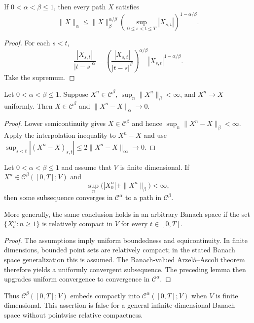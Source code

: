 \begin{lem}[Interpolation]
If $0<\alpha<\beta\le1$, then every path $X$ satisfies
\[
  \|X\|_\alpha
  \le \|X\|_\beta^{\alpha/\beta}
      \left(\sup_{0\le s<t\le T}|X_{s,t}|\right)^{1-\alpha/\beta}.
\]
\end{lem}

\begin{proof}
For each $s<t$,
\[
  \frac{|X_{s,t}|}{|t-s|^\alpha}
  =\left(\frac{|X_{s,t}|}{|t-s|^\beta}\right)^{\alpha/\beta}
   |X_{s,t}|^{1-\alpha/\beta}.
\]
Take the supremum.
\end{proof}

\begin{lem}
Let $0<\alpha<\beta\le1$.  Suppose $X^n\in\mathcal C^\beta$,
$\sup_n\|X^n\|_\beta<\infty$, and $X^n\to X$ uniformly.  Then
$X\in\mathcal C^\beta$ and $\|X^n-X\|_\alpha\to0$.
\end{lem}

\begin{proof}
Lower semicontinuity gives $X\in\mathcal C^\beta$ and hence
$\sup_n\|X^n-X\|_\beta<\infty$.  Apply the interpolation inequality to
$X^n-X$ and use
$\sup_{s<t}|(X^n-X)_{s,t}|\le2\|X^n-X\|_\infty\to0$.
\end{proof}

\begin{lem}
Let $0<\alpha<\beta\le1$ and assume that $V$ is finite dimensional.  If
$X^n\in\mathcal C^\beta([0,T];V)$ and
\[
  \sup_n\bigl(|X^n_0|+\|X^n\|_\beta\bigr)<\infty,
\]
then some subsequence converges in $\mathcal C^\alpha$ to a path in
$\mathcal C^\beta$.

More generally, the same conclusion holds in an arbitrary Banach space if the
set $\{X^n_t:n\ge1\}$ is relatively compact in $V$ for every $t\in[0,T]$.
\end{lem}

\begin{proof}
The assumptions imply uniform boundedness and equicontinuity.  In finite
dimensions, bounded point sets are relatively compact; in the stated Banach
space generalization this is assumed.  The Banach-valued Arzelà--Ascoli theorem
therefore yields a uniformly convergent subsequence.  The preceding lemma then
upgrades uniform convergence to convergence in $\mathcal C^\alpha$.
\end{proof}

\begin{remark}
Thus $\mathcal C^\beta([0,T];V)$ embeds compactly into
$\mathcal C^\alpha([0,T];V)$ when $V$ is finite dimensional.  This assertion is
false for a general infinite-dimensional Banach space without pointwise
relative compactness.
\end{remark}

